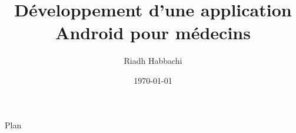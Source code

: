 \documentclass[
ucs
, xcolor=table
]{beamer}
\title[Projet de fin d'etudes]
{Développement d'une application Android pour médecins}
\author{Riadh Habbachi}
\institute[ENIG]{Ecole Nationale d'Ingénieurs de Gabes}
\date[Juin 2013]{\today}
\begin{document}
\begin{frame}
	\titlepage
\end{frame}

\begin{frame}{Plan}
	\tableofcontents
\end{frame}




\end{document}
